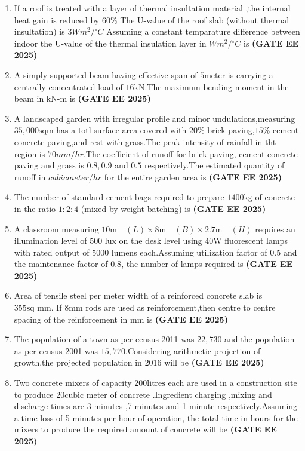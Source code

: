 \documentclass[journal,12pt,onecolumn]{IEEEtran}
\theoremstyle{remark}
\begin{document}
\begin{enumerate}
\item If a roof is treated with a layer of thermal insultation material ,the internal heat gain is reduced by $60\%$ The U-value of the roof slab (without thermal insultation) is $3 Wm^2/$$^\circ{C}$  Assuming a constant temparature difference between indoor the U-value of the thermal insulation layer in $Wm^2/$$^\circ{C}$ is \underline{\makebox[2cm]{\hfill}} \hfill \textbf{(GATE EE 2025)}
\item A simply supported beam having effective span of $5\text{meter}$ is carrying a centrally concentrated load of $16\text{kN}$.The maximum bending moment in the beam in kN-m is \underline{\makebox[2cm]{\hfill}} \hfill \textbf{(GATE EE 2025)}
\item A landscaped garden with irregular profile and minor undulations,measuring $35,000\text{sqm}$ has a totl surface area covered with $20\%$ brick paving,$15\%$ cement concrete paving,and rest with grass.The peak intensity of rainfall in tht region is $70 mm/hr$.The coefficient of runoff for brick paving, cement concrete paving and grass is $0.8,0.9$ and $0.5$ respectively.The estimated quantity of runoff in $cubic meter/hr$ for the entire garden area is \underline{\makebox[2cm]{\hfill}} \hfill \textbf{(GATE EE 2025)}
\item The number of standard cement bags required to prepare $1400\text{kg}$ of concrete in the ratio $1:2:4$ (mixed by weight batching) is \underline{\makebox[2cm]{\hfill}} \hfill \textbf{(GATE EE 2025)}
\item A classroom measuring $10\text{m} \quad (L) \times 8\text{m} \quad (B) \times 2.7\text{m} \quad (H)$ requires an illumination level of $500$ lux on the desk level using $40\text{W}$ fluorescent lamps with rated output of $5000$ lumens each.Assuming utilization factor of $0.5$ and the maintenance factor of $0.8$, the number of lamps required is \underline{\makebox[2cm]{\hfill}} \hfill \textbf{(GATE EE 2025)}
\item Area of tensile steel per meter width of a reinforced concrete slab is $355\text{sq mm}$. If $8\text{mm}$ rods are used as reinforcement,then centre to centre spacing of the reinforcement in mm is \underline{\makebox[2cm]{\hfill}} \hfill \textbf{(GATE EE 2025)}
\item The population of a town as per census 2011 was $22,730$ and the population as per census 2001 was $15,770$.Considering arithmetic projection of growth,the projected population in 2016 will be \underline{\makebox[2cm]{\hfill}} \hfill \textbf{(GATE EE 2025)}
\item Two concrete mixers of capacity $200\text{litres}$ each are used in a construction site to produce $20 \text{cubic meter}$ of concrete .Ingredient charging ,mixing and discharge times are 3 minutes ,7 minutes and 1 minute respectively.Assuming a time loss of 5 minutes per hour of operation, the total time in hours for the mixers to produce the required amount of concrete will be \underline{\makebox[2cm]{\hfill}} \hfill \textbf{(GATE EE 2025)}
\end{enumerate}

   
   
\end{document}
